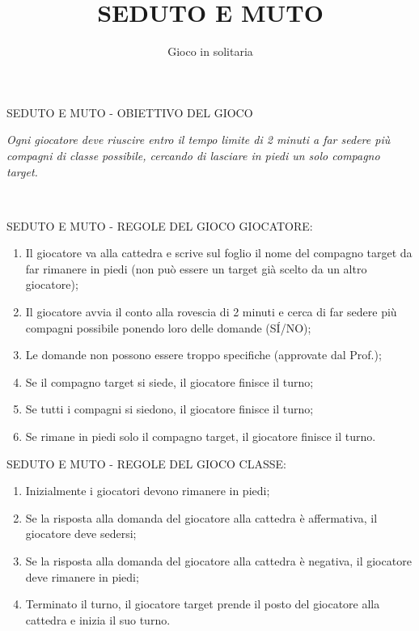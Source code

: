 \documentclass[aspectratio=1610]{beamer}
\title{SEDUTO E MUTO}
\subtitle{Gioco in solitaria}
\date{}
\institute{Materiale necessario: un foglio e una penna, un conto alla rovescia}
\begin{document}
\begin{frame}
    \titlepage
\end{frame}

\begin{frame}{SEDUTO E MUTO - OBIETTIVO DEL GIOCO}
    \begin{minipage}{0.98\linewidth}
        \centering
        \huge
        \textit{Ogni giocatore deve riuscire entro il tempo limite di 2 minuti a far sedere più compagni 
        di classe possibile, cercando di lasciare in piedi un solo compagno target.}\\
    \end{minipage}\\
\end{frame}

\begin{frame}{SEDUTO E MUTO - REGOLE DEL GIOCO}
    GIOCATORE:
    \begin{enumerate}
        \item Il giocatore va alla cattedra e scrive sul foglio il nome del compagno target da far 
        rimanere in piedi (non può essere un target già scelto da un altro giocatore);
        \item Il giocatore avvia il conto alla rovescia di 2 minuti e cerca di far sedere più compagni 
        possibile ponendo loro delle domande (S\'I/NO);
        \item Le domande non possono essere troppo specifiche (approvate dal Prof.);
        \item Se il compagno target si siede, il giocatore finisce il turno;
        \item Se tutti i compagni si siedono, il giocatore finisce il turno;
        \item Se rimane in piedi solo il compagno target, il giocatore finisce il turno.
    \end{enumerate}
\end{frame}

\begin{frame}{SEDUTO E MUTO - REGOLE DEL GIOCO}
    CLASSE:
    \begin{enumerate}
        \item Inizialmente i giocatori devono rimanere in piedi;
        \item Se la risposta alla domanda del giocatore alla cattedra è affermativa, il giocatore deve sedersi;
        \item Se la risposta alla domanda del giocatore alla cattedra è negativa, il giocatore deve rimanere in piedi;
        \item Terminato il turno, il giocatore target prende il posto del giocatore alla cattedra e inizia il suo turno.
    \end{enumerate}
\end{frame}
\end{document}
